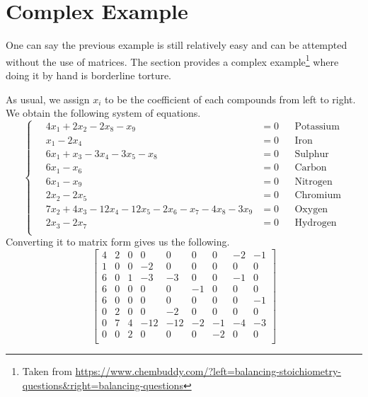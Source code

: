 \documentclass{article}
\begin{document}
	\section{Complex Example}
	One can say the previous example is still relatively easy and can be attempted without the use of matrices. The section provides a complex example\footnote{Taken from \url{https://www.chembuddy.com/?left=balancing-stoichiometry-questions&right=balancing-questions}} where doing it by hand is borderline torture.
	\begin{center}
	\end{center}
	As usual, we assign $x_i$ to be the coefficient of each compounds from left to right. We obtain the following system of equations.
	\begin{equation*}
	\left\{
	\quad
	\begin{aligned}
	4x_1 + 2x_2 - 2x_8  - x_9&= 0 &&\text{Potassium}\\
	x_1 - 2x_4          &= 0 &&\text{Iron}\\
	6x_1 + x_3- 3x_4 - 3x_5 - x_8  &= 0 &&\text{Sulphur}\\
	6x_1 - x_6          &= 0 &&\text{Carbon} \\
	6x_1 - x_9          &= 0 &&\text{Nitrogen}\\
	2x_2 - 2x_5         &= 0 &&\text{Chromium}\\
	7x_2 + 4x_3 - 12x_4 - 12x_5 - 2x_6 -x_7 - 4x_8 - 3x_9 &= 0 &&\text{Oxygen} \\
	2x_3 - 2x_7 &= 0 && \text{Hydrogen} \\
	\end{aligned}
	\right.
	\end{equation*}
	Converting it to matrix form gives us the following.
	$$
	\begin{bmatrix}
	4   &       2  &        0    &      0   &       0   &       0   &       0 &        -2  &        -1 \\
	1   &       0  &        0    &     -2   &       0   &       0   &       0 &         0  &        0\\
	6   &       0  &        1    &     -3   &      -3   &       0   &       0 &        -1  &        0\\
	6   &       0  &        0    &      0   &       0   &      -1   &       0 &         0  &        0\\
	6   &       0  &        0    &      0   &       0   &       0   &       0 &         0  &       -1\\
	0   &       2  &        0    &      0   &      -2   &       0   &       0 &         0  &        0\\
	0   &       7  &        4    &    -12   &     -12   &      -2   &      -1 &        -4  &       -3\\
	0   &       0  &        2    &      0   &       0   &       0   &      -2 &         0  &        0\\
	\end{bmatrix}
	$$
\end{document}
